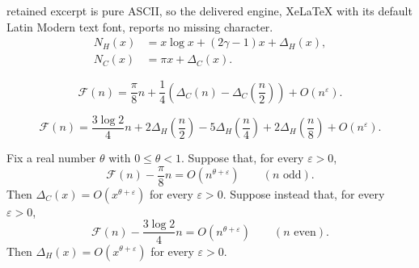 \documentclass[10pt,a4paper]{amsart}
\newcommand{\FF}{\mathcal F}
\newcommand{\eps}{\varepsilon}
\begin{document}
retained excerpt is pure ASCII, so the delivered engine, XeLaTeX with its default Latin Modern text font, reports no missing character.
\begin{align}
 N_H(x)&=x\log x+(2\gamma-1)x+\Delta_H(x),
      \label{eq:def-hyperbola}\\
 N_C(x)&=\pi x+\Delta_C(x).
      \label{eq:def-circle}
\end{align}

\begin{equation}\label{eq:odd-main}
 \FF(n)=\frac{\pi}{8}n
 +\frac14\left(\Delta_C(n)-\Delta_C\left(\frac n2\right)\right)
 +O(n^\eps).
\end{equation}

\begin{equation}\label{eq:even-main}
 \FF(n)=\frac{3\log 2}{4}n
 +2\Delta_H\left(\frac n2\right)
 -5\Delta_H\left(\frac n4\right)
 +2\Delta_H\left(\frac n8\right)
 +O(n^\eps).
\end{equation}

\begin{proposition}\label{prop:converse}
Fix a real number $\theta$ with $0\leq\theta<1$.
Suppose that, for every $\eps>0$,
\[
 \FF(n)-\frac{\pi}{8}n=O(n^{\theta+\eps})
 \qquad (n\text{ odd}).
\]
Then $\Delta_C(x)=O(x^{\theta+\eps})$ for every $\eps>0$.
Suppose instead that, for every $\eps>0$,
\[
 \FF(n)-\frac{3\log 2}{4}n=O(n^{\theta+\eps})
 \qquad (n\text{ even}).
\]
Then $\Delta_H(x)=O(x^{\theta+\eps})$ for every $\eps>0$.
\end{proposition}
\end{document}

